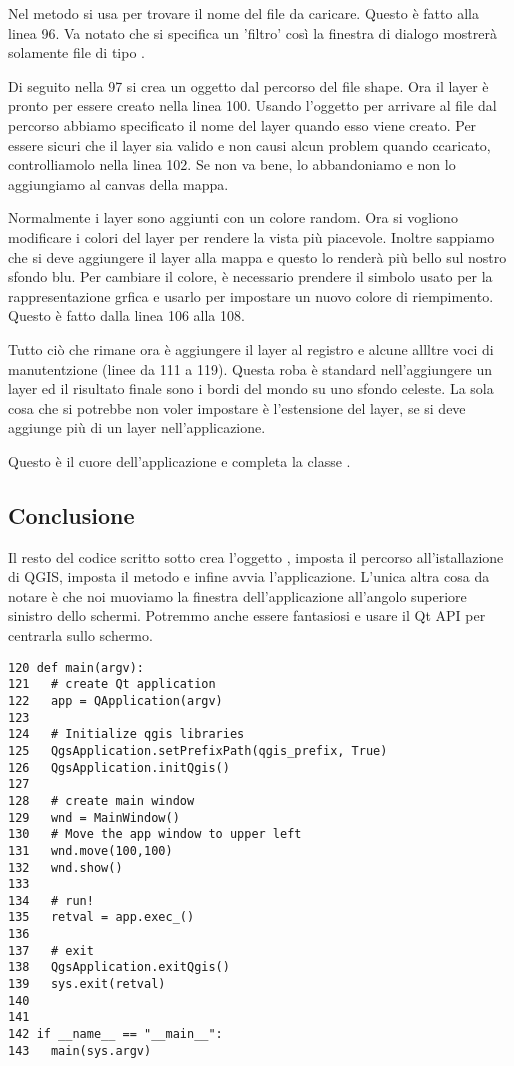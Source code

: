 Nel metodo  si usa  per trovare il nome del file da caricare. Questo è fatto alla linea 96. Va notato che si specifica un 'filtro' così la finestra di dialogo mostrerà solamente file di tipo .

Di seguito nella 97 si crea un oggetto  dal percorso del file shape.  Ora il layer è pronto per essere creato nella linea 100. Usando l'oggetto  per arrivare al file dal percorso abbiamo specificato il nome del layer quando esso viene creato.  Per essere sicuri che il layer sia valido e non causi alcun problem quando ccaricato, controlliamolo nella linea 102. Se non va bene, lo abbandoniamo e non lo aggiungiamo al canvas della mappa.

Normalmente i layer sono aggiunti con un colore random. Ora si vogliono modificare i colori del layer per rendere la vista più piacevole. Inoltre sappiamo che si deve aggiungere il layer  alla mappa e questo lo renderà più bello sul nostro sfondo blu. Per cambiare il colore, è necessario prendere il simbolo usato per la rappresentazione grfica e usarlo per impostare un nuovo colore di riempimento. Questo è fatto dalla linea 106 alla 108. 

Tutto ciò che rimane ora è aggiungere il layer al registro e alcune allltre voci di manutentzione (linee da 111 a 119). Questa roba è standard nell'aggiungere un layer ed il risultato finale sono i bordi del mondo su uno sfondo celeste. La sola cosa che si potrebbe non voler impostare è l'estensione del layer, se si deve aggiunge più di un layer nell'applicazione.

Questo è il cuore dell'applicazione e completa la classe . 

\subsection{Conclusione}

Il resto del codice scritto sotto crea l'oggetto , imposta il percorso all'istallazione di QGIS, imposta il metodo  e infine avvia l'applicazione. L'unica altra cosa da notare è che noi muoviamo la finestra dell'applicazione all'angolo superiore sinistro dello schermi. Potremmo anche essere fantasiosi e usare il Qt API per centrarla sullo schermo.

\begin{verbatim}
120 def main(argv):
121   # create Qt application
122   app = QApplication(argv)
123 
124   # Initialize qgis libraries
125   QgsApplication.setPrefixPath(qgis_prefix, True)
126   QgsApplication.initQgis()
127 
128   # create main window
129   wnd = MainWindow()
130   # Move the app window to upper left
131   wnd.move(100,100)
132   wnd.show()
133 
134   # run!
135   retval = app.exec_()
136   
137   # exit
138   QgsApplication.exitQgis()
139   sys.exit(retval)
140 
141 
142 if __name__ == "__main__":
143   main(sys.argv)
\end{verbatim}

